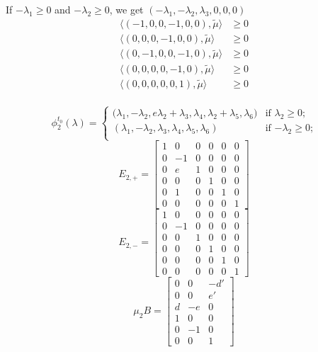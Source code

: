 \documentclass{amsart}
\numberwithin{theorem}{section}
\begin{document}
  If $-\lambda_1 \ge 0$ and $-\lambda_2 \ge 0$, we get $(-\lambda_1,-\lambda_2,\lambda_3,0,0,0)$
  \begin{align*}
    \langle (-1,0,0,-1,0,0), \tilde\mu\rangle &\ge 0\\ 
    \langle (0,0,0,-1,0,0), \tilde\mu\rangle &\ge 0\\ 
    \langle (0,-1,0,0,-1,0), \tilde\mu\rangle &\ge 0\\ 
    \langle (0,0,0,0,-1,0), \tilde\mu\rangle &\ge 0\\ 
    \langle (0,0,0,0,0,1), \tilde\mu\rangle &\ge 0\\ 
  \end{align*}

  \[
    \phi^{t_0}_2(\lambda)
    =
    \begin{cases} 
      \big(\lambda_1,-\lambda_2,e\lambda_2+\lambda_3,\lambda_4,\lambda_2+\lambda_5,\lambda_6\big) & \text{if $\lambda_2 \ge 0$;}\\
      (\lambda_1,-\lambda_2,\lambda_3,\lambda_4,\lambda_5,\lambda_6) & \text{if $-\lambda_2 \ge 0$;}\\
    \end{cases}
  \]
  \[E_{2,+}=\left[\begin{array}{cccccc} 1 & 0 & 0 & 0 & 0 & 0 \\ 0 & -1 & 0 & 0 & 0 & 0\\ 0 & e & 1 & 0 & 0 & 0\\ 0 & 0 & 0 & 1 & 0 & 0\\ 0 & 1 & 0 & 0 & 1 & 0\\ 0 & 0 & 0 & 0 & 0 &  1\end{array}\right]\]
  \[E_{2,-}=\left[\begin{array}{cccccc} 1 & 0 & 0 & 0 & 0 & 0 \\ 0 & -1 & 0 & 0 & 0 & 0\\ 0 & 0 & 1 & 0 & 0 & 0\\ 0 & 0 & 0 & 1 & 0 & 0\\ 0 & 0 & 0 & 0 & 1 & 0\\ 0 & 0 & 0 & 0 & 0 &  1\end{array}\right]\]
  \[
    \mu_2 B=\left[\begin{array}{ccc} 
    0 & 0 & -d' \\ 
    0 & 0 & e'\\ 
    d & -e & 0\\ 
    1 & 0 & 0\\ 
    0 & -1 & 0\\ 
    0 & 0 & 1
    \end{array}\right]
  \]
\end{document}

